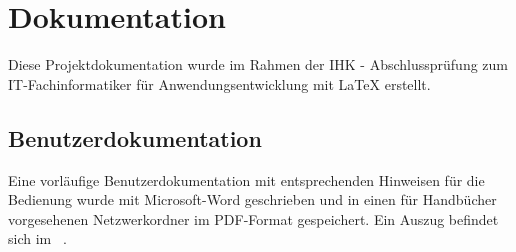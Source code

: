 \section{Dokumentation}
\label{sec:Dokumentation}
Diese Projektdokumentation wurde im Rahmen der IHK - Abschlussprüfung zum IT-Fachinformatiker für Anwendungsentwicklung mit \LaTeX{ } erstellt.


\subsection{Benutzerdokumentation}
\label{subsec:Benutzerdokumentation}
Eine vorläufige Benutzerdokumentation mit entsprechenden Hinweisen für die Bedienung wurde mit Microsoft-Word geschrieben und in einen für Handbücher vorgesehenen Netzwerkordner im PDF-Format gespeichert. Ein Auszug befindet sich im ~.

